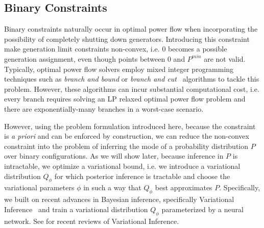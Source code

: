 \subsection{Binary Constraints}
\label{sec:bin_contraints}
Binary constraints naturally occur in optimal power flow when incorporating the possibility of completely shutting down generators. Introducing this constraint make generation limit constraints non-convex, i.e. $0$ becomes a possible generation assignment, even though points between $0$ and $P^{min}$ are not valid. Typically, optimal power flow solvers employ mixed integer programming techniques such as \emph{branch and bound} or \emph{branch and cut}~\cite{lawler1966branch} algorithms to tackle this problem. However, these algorithms can incur substantial computational cost, i.e. every branch requires solving an LP relaxed optimal power flow problem and there are exponentially-many branches in a worst-case scenario.

However, using the problem formulation introduced here, because the constraint is \emph{a priori} and can be enforced by construction, we can reduce the non-convex constraint into the problem of inferring the mode of a probability distribution $P$ over binary configurations. As we will show later, because inference in $P$ is intractable, we optimize a variational bound, i.e. we introduce a variational distribution $Q_\phi$ for which posterior inference is tractable and choose the variational parameters $\phi$ in such a way that $Q_\phi$ best approximates $P$. Specifically, we built on recent advances in Bayesian inference, specifically Variational Inference~\cite{wainwright2008graphical} and train a variational distribution $Q_\phi$ parameterized by a neural network. See \cite{blei2017variational,zhang2017advances} for recent reviews of Variational Inference.

